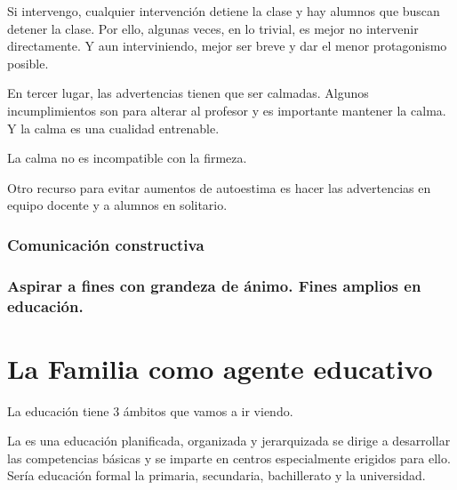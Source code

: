 \documentclass[palatino]{apuntesURJC}
\begin{document}
Si intervengo, cualquier intervención detiene la clase y hay alumnos que buscan detener la clase. 
%
Por ello, algunas veces, en lo trivial, es mejor no intervenir directamente.
%
Y aun interviniendo, mejor ser breve y dar el menor protagonismo posible.

En tercer lugar, las advertencias tienen que ser calmadas. 
%
Algunos incumplimientos son para alterar al profesor y es importante mantener la calma. 
%
Y la calma es una cualidad entrenable.

La calma no es incompatible con la firmeza.

Otro recurso para evitar aumentos de autoestima es hacer las advertencias en equipo docente y a alumnos en solitario.



\subsection{Comunicación constructiva}

\subsection{Aspirar a fines con grandeza de ánimo. Fines amplios en educación.}






\chapter{La Familia como agente educativo}

La educación tiene 3 ámbitos que vamos a ir viendo.

La  es una educación planificada, organizada y jerarquizada se dirige a desarrollar las competencias básicas y se imparte en centros especialmente erigidos para ello.
%
Sería educación formal la primaria, secundaria, bachillerato y la universidad.
\end{document}
